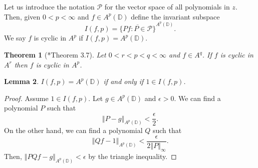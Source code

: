 \documentclass{amsart}
\newcommand{\norm}[1]{\left\Vert {#1}\right\Vert}
\newcommand{\ep}{\epsilon}
\newtheorem{theorem}{Theorem}[section]
\newtheorem{lemma}[theorem]{Lemma}
\theoremstyle{definition}
\numberwithin{equation}{section}
\begin{document}
Let us introduce the notation $\mathcal P$ for the vector space of all polynomials in $z$. Then, given $0<p<\infty$ and $f \in A^p(\mathbb D)$ define the invariant subspace
    \[ I(f,p) = \overline{\{ Pf : P \in \mathcal P \}}^{A^p(\mathbb D)}. \]
We say $f$ is cyclic in $A^p$ if $I(f,p) = A^p(\mathbb D)$.
\begin{theorem}[\cite{HKZ00}*{Theorem 3.7}]\label{thm:cyclic}
Let $0<r<p<q<\infty$ and $f \in A^q$. If $f$ is cyclic in $A^r$ then $f$ is cyclic in $A^p$.
\end{theorem}
    
\begin{lemma}
    $I(f,p) = A^p(\mathbb D)$ if and only if $1 \in I(f,p)$.
\end{lemma}
\begin{proof}
   Assume $1 \in I(f,p).$ Let $g \in A^p(\mathbb D)$ and $\ep>0$. We can find a polynomial $P$ such that
        \[ \norm{P-g}_{A^p(\mathbb D)} < \frac \ep 2.\]
    On the other hand, we can find a polynomial $Q$ such that 
        \[ \norm{Qf-1}_{A^p(\mathbb D)} < \frac{\ep}{2 \norm{P}_\infty}.\]
    Then, $\norm{PQf-g}_{A^p(\mathbb D)} < \ep$ by the triangle inequality.
\end{proof}
\end{document}
